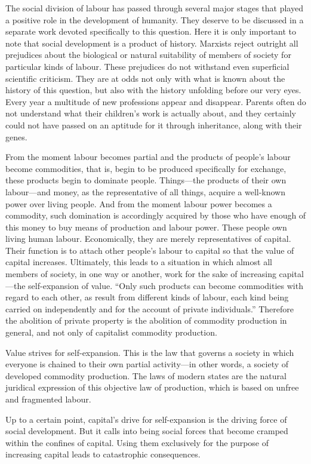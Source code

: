 \documentclass[12pt,a4paper,openany]{book}
\begin{document}
The social division of labour has passed through several major stages that played a positive role in the development of humanity. They deserve to be discussed in a separate work devoted specifically to this question. Here it is only important to note that social development is a product of history. Marxists reject outright all prejudices about the biological or natural suitability of members of society for particular kinds of labour. These prejudices do not withstand even superficial scientific criticism. They are at odds not only with what is known about the history of this question, but also with the history unfolding before our very eyes. Every year a multitude of new professions appear and disappear. Parents often do not understand what their children’s work is actually about, and they certainly could not have passed on an aptitude for it through inheritance, along with their genes.

From the moment labour becomes partial and the products of people’s labour become commodities, that is, begin to be produced specifically for exchange, these products begin to dominate people. Things—the products of their own labour—and money, as the representative of all things, acquire a well-known power over living people. And from the moment labour power becomes a commodity, such domination is accordingly acquired by those who have enough of this money to buy means of production and labour power. These people own living human labour. Economically, they are merely representatives of capital. Their function is to attach other people’s labour to capital so that the value of capital increases. Ultimately, this leads to a situation in which almost all members of society, in one way or another, work for the sake of increasing capital—the self-expansion of value. “Only such products can become commodities with regard to each other, as result from different kinds of labour, each kind being carried on independently and for the account of private individuals.” Therefore the abolition of private property is the abolition of commodity production in general, and not only of capitalist commodity production.

Value strives for self-expansion. This is the law that governs a society in which everyone is chained to their own partial activity—in other words, a society of developed commodity production. The laws of modern states are the natural juridical expression of this objective law of production, which is based on unfree and fragmented labour.

Up to a certain point, capital's drive for self-expansion is the driving force of social development. But it calls into being social forces that become cramped within the confines of capital. Using them exclusively for the purpose of increasing capital leads to catastrophic consequences.
\end{document}
